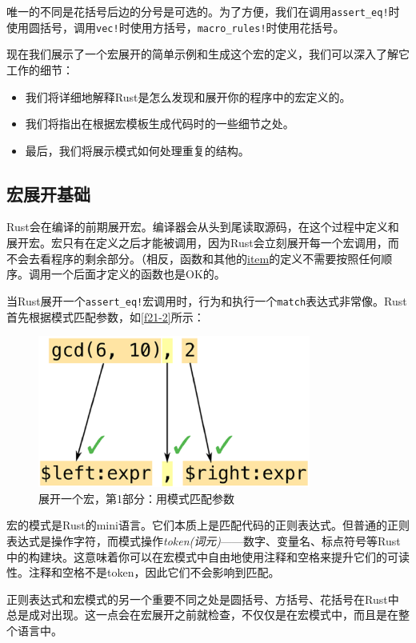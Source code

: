 唯一的不同是花括号后边的分号是可选的。为了方便，我们在调用\texttt{assert\_eq!}时使用圆括号，调用\texttt{vec!}时使用方括号，\texttt{macro\_rules!}时使用花括号。

现在我们展示了一个宏展开的简单示例和生成这个宏的定义，我们可以深入了解它工作的细节：
\begin{itemize}
    \item 我们将详细地解释Rust是怎么发现和展开你的程序中的宏定义的。
    \item 我们将指出在根据宏模板生成代码时的一些细节之处。
    \item 最后，我们将展示模式如何处理重复的结构。
\end{itemize}

\subsection{宏展开基础}
Rust会在编译的前期展开宏。编译器会从头到尾读取源码，在这个过程中定义和展开宏。宏只有在定义之后才能被调用，因为Rust会立刻展开每一个宏调用，而不会去看程序的剩余部分。（相反，函数和其他的\hyperref[static]{item}的定义不需要按照任何顺序。调用一个后面才定义的函数也是OK的。

当Rust展开一个\texttt{assert\_eq!}宏调用时，行为和执行一个\texttt{match}表达式非常像。Rust首先根据模式匹配参数，如\autoref{f21-2}所示：
\begin{figure}[htbp]
    \centering
    \includegraphics[width=0.8\textwidth]{../img/f21-2.png}
    \caption{展开一个宏，第1部分：用模式匹配参数}
    \label{f21-2}
\end{figure}

宏的模式是Rust的mini语言。它们本质上是匹配代码的正则表达式。但普通的正则表达式是操作字符，而模式操作\emph{token(词元)}——数字、变量名、标点符号等Rust中的构建块。这意味着你可以在宏模式中自由地使用注释和空格来提升它们的可读性。注释和空格不是token，因此它们不会影响到匹配。

正则表达式和宏模式的另一个重要不同之处是圆括号、方括号、花括号在Rust中总是成对出现。这一点会在宏展开之前就检查，不仅仅是在宏模式中，而且是在整个语言中。

